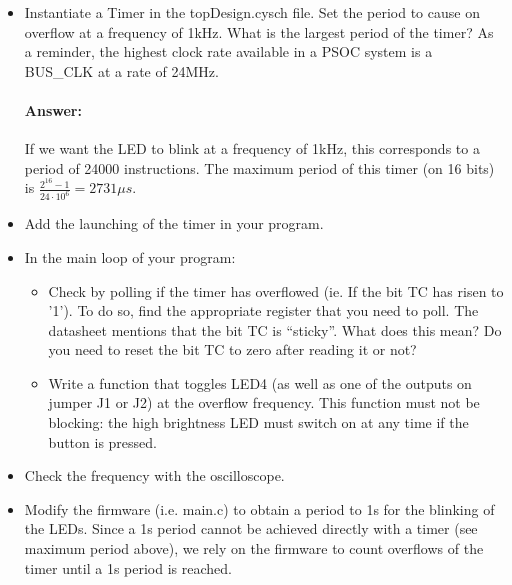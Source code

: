 \documentclass[11pt,a4paper]{article}
\theoremstyle{definition}%
\newcommand{\reponse}[1]{%
	\ifthenelse {\boolean{corrige}} {\paragraph{Answer:} \color{darkblue}   #1\color{black}} {}
 }
\begin{document}
\begin{itemize}
	\item Instantiate a Timer in the topDesign.cysch file. Set the period to cause on overflow at a frequency of 1kHz. What is the largest period of the timer? As a reminder, the highest clock rate available in a PSOC system is a BUS\_CLK at a rate of 24MHz.
	\reponse{If we want the LED to blink at a frequency of 1kHz, this corresponds to a period of 24000 instructions. The maximum period of this timer (on 16 bits) is $\frac{2^{16}-1}{24\cdot10^6} = 2731 \mu s $. }
	\item Add the launching of the timer in your program.
	\item In the main loop of your program:
	\begin{itemize}
		\item Check by polling if the timer has overflowed (ie. If the bit TC has risen to '1'). To do so, find the appropriate register that you need to poll. The datasheet mentions that the bit TC is ``sticky''. What does this mean? Do you need to reset the bit TC to zero after reading it or not? 
		\item Write a function that toggles LED4 (as well as one of the outputs on jumper J1 or J2) at the overflow frequency. This function must not be blocking: the high brightness LED must switch on at any time if the button is pressed.
	\end{itemize}
	\item Check the frequency with the oscilloscope.
	\item Modify the firmware (i.e. main.c) to obtain a period to 1s for the blinking of the LEDs. Since a 1s period cannot be achieved directly with a timer (see maximum period above), we rely on the firmware to count overflows of the timer until a 1s period is reached. 
\end{itemize}
\end{document}
